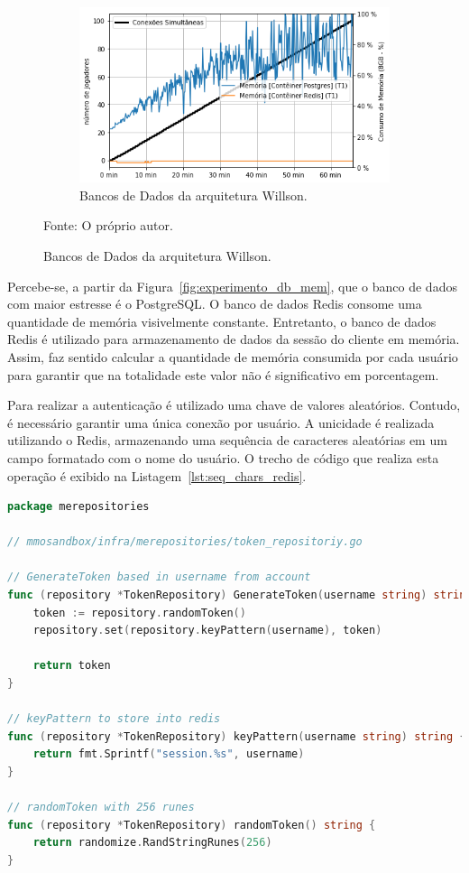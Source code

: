 \begin{figure}[htb!]
    \begin{subfigure}{0.5\textwidth}
        \centering
        \includegraphics[width=.95\linewidth]{figuras/testes/w_mem_db.png}
        \caption{Bancos de Dados da arquitetura Willson.}
        \label{fig:w_mem_db}
    \end{subfigure}

    \vspace{-0.3cm}
    Fonte: O próprio autor.
\end{figure}

Percebe-se, a partir da Figura~\ref{fig:experimento_db_mem}, que o banco de dados com maior estresse é o PostgreSQL.
%
O banco de dados Redis consome uma quantidade de memória visivelmente constante.
%
Entretanto, o banco de dados Redis é utilizado para armazenamento de dados da sessão do cliente em memória.
%
Assim, faz sentido calcular a quantidade de memória consumida por cada usuário para garantir que na totalidade este valor não é significativo em porcentagem.

Para realizar a autenticação é utilizado uma chave de valores aleatórios.
%
Contudo, é necessário garantir uma única conexão por usuário.
%
A unicidade é realizada utilizando o Redis, armazenando uma sequência de caracteres aleatórias em um campo formatado com o nome do usuário.
%
O trecho de código que realiza esta operação é exibido na Listagem~\ref{lst:seq_chars_redis}.



\begin{lstlisting}[language=go,firstnumber=1, caption={Informações do Bloco},label={lst:seq_chars_redis}]
package merepositories

// mmosandbox/infra/merepositories/token_repositoriy.go

// GenerateToken based in username from account
func (repository *TokenRepository) GenerateToken(username string) string {
    token := repository.randomToken()
    repository.set(repository.keyPattern(username), token)

    return token
}

// keyPattern to store into redis
func (repository *TokenRepository) keyPattern(username string) string {
    return fmt.Sprintf("session.%s", username)
}

// randomToken with 256 runes
func (repository *TokenRepository) randomToken() string {
    return randomize.RandStringRunes(256)
}
\end{lstlisting}

